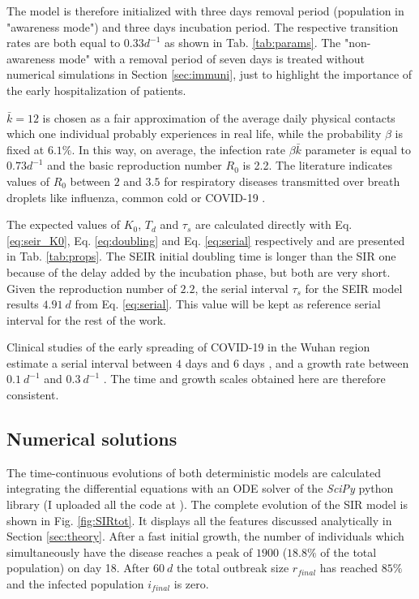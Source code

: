 \documentclass[DIV=12, BCOR=0pt]{scrartcl}  %
\begin{document}
  The model is therefore initialized with three days removal period (population in "awareness mode") and three days incubation period. 
  The respective transition rates are both equal to $0.33 d^{-1}$ as shown in Tab. \ref{tab:params}. 
  The "non-awareness mode" with a removal period of seven days is treated without numerical simulations in Section \ref{sec:immuni}, just to highlight the importance of the early hospitalization of patients. 
  
 
  $\bar{k} = 12$ is chosen as a fair approximation of the average daily physical contacts which one individual probably experiences in real life, while the probability $\beta$ is fixed at $6.1 \%$. In this way, on average, the infection rate $\beta \bar{k}$ parameter is equal to $0.73 d^{-1}$ and the basic reproduction number $R_0$ is 2.2. The literature indicates values of $R_0$ between $2$ and $3.5$ for respiratory diseases transmitted over breath droplets like influenza, common cold or COVID-19 \citep{Hilton2020, Sanche2020, Firth2020}.
  
  The expected values of $K_0$, $T_d$ and $\tau_s$ are calculated directly with Eq. \ref{eq:seir_K0}, Eq. \ref{eq:doubling} and Eq. \ref{eq:serial} respectively and are presented in Tab. \ref{tab:props}. The SEIR initial doubling time is longer than the SIR one because of the delay added by the incubation phase, but both are very short. Given the reproduction number of $2.2$, the serial interval $\tau_s$ for the SEIR model results $4.91 \ d$ from Eq. \ref{eq:serial}. This value will be kept as reference serial interval for the rest of the work.
  
  Clinical studies of the early spreading of COVID-19 in the Wuhan region estimate a serial interval between $4$ days \citep{Du2020} and $6$ days \citep{Firth2020}, and a growth rate between $0.1 \ d^{-1}$ \citep{Du2020} and $0.3 \ d^{-1}$ \citep{Sanche2020}. The time and growth scales obtained here are therefore consistent.
    
  
  \subsection{Numerical solutions}
	The time-continuous evolutions of both deterministic models are calculated integrating the differential equations with an ODE solver of the \textit{SciPy} python library (I uploaded all the code at \citet{pyndemic}). 	%
	The complete evolution of the SIR model is shown in Fig. \ref{fig:SIRtot}. It displays all the features discussed analytically in Section \ref{sec:theory}. After a fast initial growth, the number of individuals which simultaneously have the disease reaches a peak of $1900$ ($18.8 \%$ of the total population) on day 18. After $60 \ d$ the total outbreak size $r_{final}$ has reached $85 \%$ and the infected population $i_{final}$ is zero.
	
\end{document}
